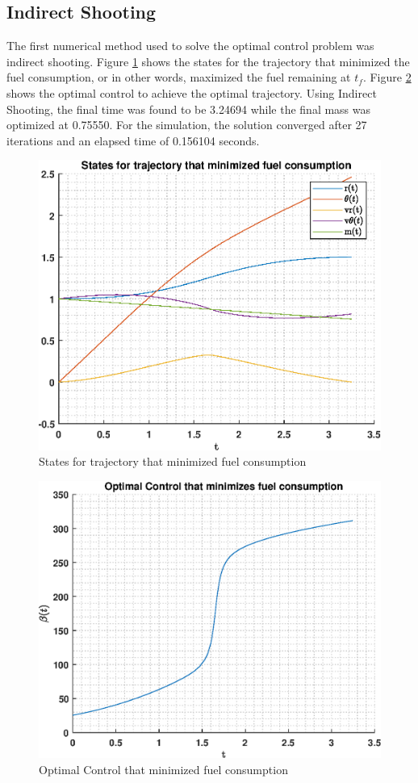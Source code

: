 \documentclass[]{article}
\begin{document}
\subsection{Indirect Shooting}
The first numerical method used to solve the optimal control problem was indirect shooting. Figure \ref{fig:indirectStates} shows the states for the trajectory that minimized the fuel consumption, or in other words, maximized the fuel remaining at \(t_f\). Figure \ref{fig:indirectControl} shows the optimal control to achieve the optimal trajectory. Using Indirect Shooting, the final time was found to be 3.24694 while the final mass was optimized at 0.75550. For the simulation, the solution converged after 27 iterations and an elapsed time of 0.156104 seconds.
\begin{figure}[hbt!]
	\centering
	\includegraphics[scale=0.75]{indirectStates.eps}
    \caption{States for trajectory that minimized fuel consumption}
	\label{fig:indirectStates}
\end{figure}
\begin{figure}
	\centering
	\includegraphics[scale=0.75]{indirectControl.eps}
	\caption{Optimal Control that minimized fuel consumption}
	\label{fig:indirectControl}
\end{figure}
\end{document}
